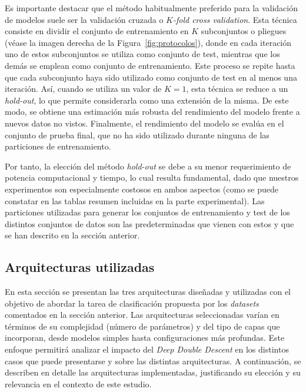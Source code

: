 Es importante destacar que el método habitualmente preferido para la validación de modelos suele ser la validación cruzada o \textit{$K$-fold cross validation}. Esta técnica consiste en dividir el conjunto de entrenamiento en $K$ subconjuntos o pliegues (véase la imagen derecha de la Figura~\ref{fig:protocolos}), donde en cada iteración uno de estos subconjuntos se utiliza como conjunto de test, mientras que los demás se emplean como conjunto de entrenamiento. Este proceso se repite hasta que cada subconjunto haya sido utilizado como conjunto de test en al menos una iteración. Así, cuando se utiliza un valor de $K = 1$, esta técnica se reduce a un \textit{hold-out}, lo que permite considerarla como una extensión de la misma. De este modo, se obtiene una estimación más robusta del rendimiento del modelo frente a nuevos datos no vistos. Finalmente, el rendimiento del modelo se evalúa en el conjunto de prueba final, que no ha sido utilizado durante ninguna de las particiones de entrenamiento.

Por tanto, la elección del método \textit{hold-out} se debe a su menor requerimiento de potencia computacional y tiempo, lo cual resulta fundamental, dado que nuestros experimentos son especialmente costosos en ambos aspectos (como se puede constatar en las tablas resumen incluidas en la parte experimental). Las particiones utilizadas para generar los conjuntos de entrenamiento y test de los distintos conjuntos de datos son las predeterminadas que vienen con estos y que se han descrito en la sección anterior.

\subsection{Arquitecturas utilizadas}\label{subsec:arquitecturas}

En esta sección se presentan las tres arquitecturas diseñadas y utilizadas con el objetivo de abordar la tarea de clasificación propuesta por los \textit{datasets} comentados en la sección anterior. Las arquitecturas seleccionadas varían en términos de su complejidad (número de parámetros) y del tipo de capas que incorporan, desde modelos simples hasta configuraciones más profundas. Este enfoque permitirá analizar el impacto del \textit{Deep Double Descent} en los distintos casos que puede presentarse y sobre las distintas arquitecturas. A continuación, se describen en detalle las arquitecturas implementadas, justificando su elección y su relevancia en el contexto de este estudio.

